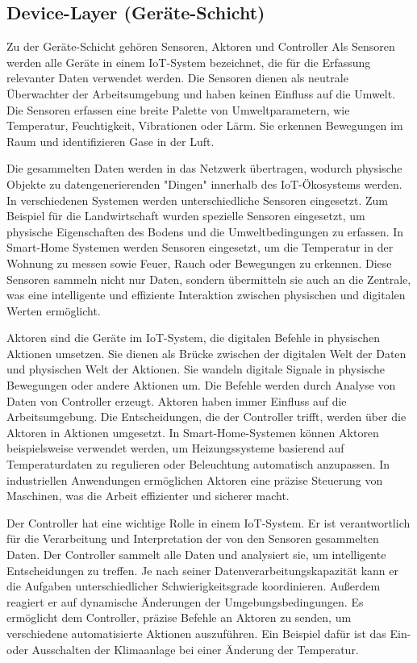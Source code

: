 \documentclass[12pt, a4paper]{article}
\begin{document}
\subsection{Device-Layer (Geräte-Schicht)}
\par Zu der Geräte-Schicht gehören Sensoren, Aktoren und Controller Als Sensoren werden alle Geräte in einem IoT-System bezeichnet, die für die Erfassung relevanter Daten verwendet werden. Die Sensoren dienen als neutrale Überwachter der Arbeitsumgebung und haben keinen Einfluss auf die Umwelt. Die Sensoren erfassen eine breite Palette von Umweltparametern, wie Temperatur, Feuchtigkeit, Vibrationen oder Lärm. Sie erkennen Bewegungen im Raum und identifizieren Gase in der Luft. 
\par Die gesammelten Daten werden in das Netzwerk übertragen, wodurch physische Objekte zu datengenerierenden "Dingen" innerhalb des IoT-Ökosystems werden. In verschiedenen Systemen werden unterschiedliche Sensoren eingesetzt. Zum Beispiel für die Landwirtschaft wurden spezielle Sensoren eingesetzt, um physische Eigenschaften des Bodens und die Umweltbedingungen zu erfassen. In Smart-Home Systemen werden Sensoren eingesetzt, um die Temperatur in der Wohnung zu messen sowie Feuer, Rauch oder Bewegungen zu erkennen. Diese Sensoren sammeln nicht nur Daten, sondern übermitteln sie auch an die Zentrale, was eine intelligente und effiziente Interaktion zwischen physischen und digitalen Werten ermöglicht.
\par Aktoren sind die Geräte im IoT-System, die digitalen Befehle in physischen Aktionen umsetzen. Sie dienen als Brücke zwischen der digitalen Welt der Daten und physischen Welt der Aktionen. Sie wandeln digitale Signale in physische Bewegungen oder andere Aktionen um. Die Befehle werden durch Analyse von Daten von Controller erzeugt. Aktoren haben immer Einfluss auf die Arbeitsumgebung. Die Entscheidungen, die der Controller trifft, werden über die Aktoren in Aktionen umgesetzt. In Smart-Home-Systemen können Aktoren beispielsweise verwendet werden, um Heizungssysteme basierend auf Temperaturdaten zu regulieren oder Beleuchtung automatisch anzupassen. In industriellen Anwendungen ermöglichen Aktoren eine präzise Steuerung von Maschinen, was die Arbeit effizienter und sicherer macht. 
\par Der Controller hat eine wichtige Rolle in einem IoT-System. Er ist verantwortlich für die Verarbeitung und Interpretation der von den Sensoren gesammelten Daten. Der Controller sammelt alle Daten und analysiert sie, um intelligente Entscheidungen zu treffen. Je nach seiner Datenverarbeitungskapazität kann er die Aufgaben unterschiedlicher Schwierigkeitsgrade koordinieren. Außerdem reagiert er auf dynamische Änderungen der Umgebungsbedingungen. Es ermöglicht dem Controller, präzise Befehle an Aktoren zu senden, um verschiedene automatisierte Aktionen auszuführen. Ein Beispiel dafür ist das Ein- oder Ausschalten der Klimaanlage bei einer Änderung der Temperatur.
\end{document}

